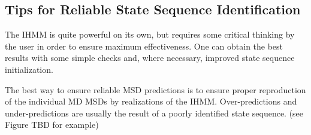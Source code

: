 \documentclass{article}
\begin{document}
  
  \subsection{Tips for Reliable State Sequence Identification}\label{section:fitting_tips}
  
  The IHMM is quite powerful on its own, but requires some critical thinking by
  the user in order to ensure maximum effectiveness. One can obtain 
  the best results with some simple checks and, where necessary, improved 
  state sequence initialization.
  
  The best way to ensure reliable MSD predictions is to ensure proper reproduction
  of the individual MD MSDs by realizations of the IHMM. Over-predictions and 
  under-predictions are usually the result of a poorly identified state sequence. (see
  Figure TBD for example)
  
\end{document}
